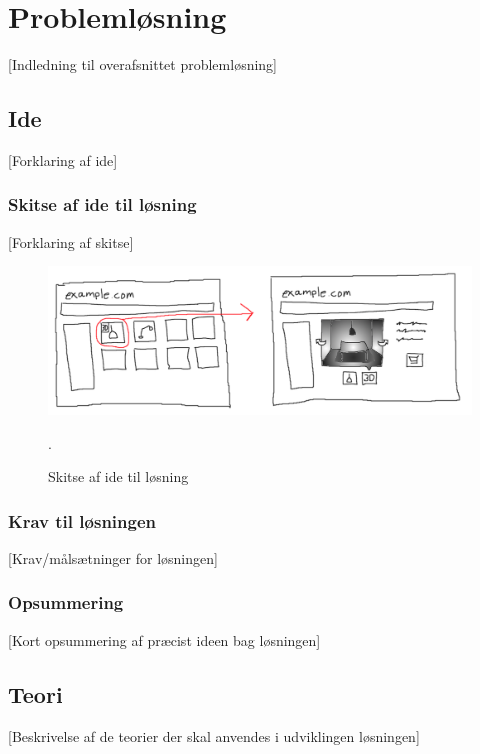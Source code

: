 \section{Problemløsning}

[Indledning til overafsnittet problemløsning]

\subsection{Ide}

[Forklaring af ide]

\subsubsection{Skitse af ide til løsning}

[Forklaring af skitse]

\begin{figure}[H]
   \centering
   \includegraphics[width=\textwidth]{../graphics/skitse_til_loesning}
   \caption{Skitse af ide til løsning}.
\end{figure}

\subsubsection{Krav til løsningen}

[Krav/målsætninger for løsningen]

\subsubsection*{Opsummering}

[Kort opsummering af præcist ideen bag løsningen]

\subsection{Teori}

[Beskrivelse af de teorier der skal anvendes i udviklingen løsningen]

